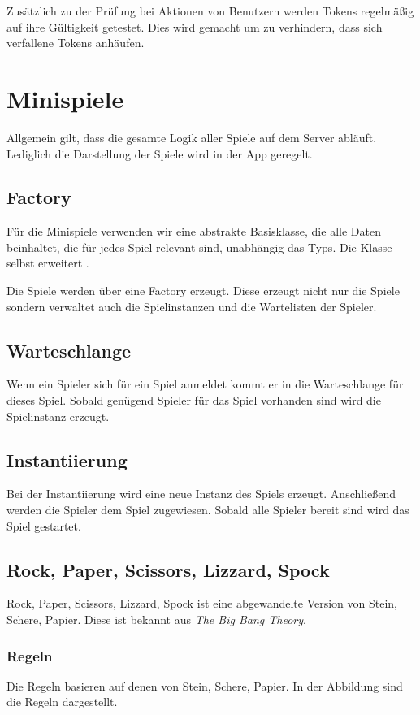 Zusätzlich zu der Prüfung bei Aktionen von Benutzern werden Tokens regelmäßig auf ihre Gültigkeit getestet. Dies wird gemacht um zu verhindern, dass sich verfallene Tokens anhäufen.

\section{Minispiele}
Allgemein gilt, dass die gesamte Logik aller Spiele auf dem Server abläuft. Lediglich die Darstellung der Spiele wird in der App geregelt.

\subsection{Factory}
Für die Minispiele verwenden wir eine abstrakte Basisklasse, die alle Daten beinhaltet, die für jedes Spiel relevant sind, unabhängig das Typs. Die Klasse selbst erweitert .

Die Spiele werden über eine Factory erzeugt. Diese erzeugt nicht nur die Spiele sondern verwaltet auch die Spielinstanzen und die Wartelisten der Spieler. 

\subsection{Warteschlange}
Wenn ein Spieler sich für ein Spiel anmeldet kommt er in die Warteschlange für dieses Spiel. Sobald genügend Spieler für das Spiel vorhanden sind wird die Spielinstanz erzeugt.

\subsection{Instantiierung}
Bei der Instantiierung wird eine neue Instanz des Spiels erzeugt. Anschließend werden die Spieler dem Spiel zugewiesen. Sobald alle Spieler bereit sind wird das Spiel gestartet.

\subsection{Rock, Paper, Scissors, Lizzard, Spock}
Rock, Paper, Scissors, Lizzard, Spock ist eine abgewandelte Version von Stein, Schere, Papier. Diese ist bekannt aus \textit{The Big Bang Theory}. 

\subsubsection{Regeln}
Die Regeln basieren auf denen von Stein, Schere, Papier. In der Abbildung sind die Regeln dargestellt.

